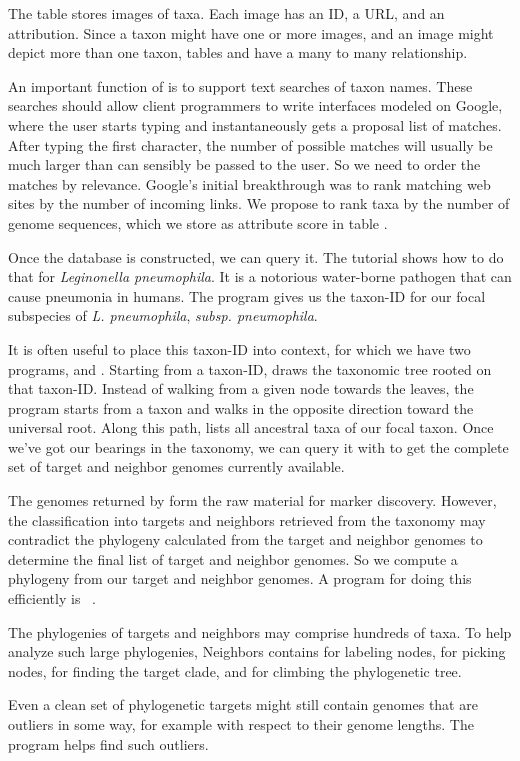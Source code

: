 The table  stores images of taxa. Each image has an ID, a
URL, and an attribution. Since a taxon might have one or more images,
and an image might depict more than one taxon, tables 
and  have a many to many relationship.

An important function of  is to support text searches of
taxon names. These searches should allow client programmers to write
interfaces modeled on Google, where the user starts typing and
instantaneously gets a proposal list of matches. After typing the
first character, the number of possible matches will usually be much
larger than can sensibly be passed to the user. So we need to order
the matches by relevance. Google's initial breakthrough was to rank
matching web sites by the number of incoming links. We propose to rank
taxa by the number of genome sequences, which we store as attribute
score in table .

Once the database is constructed, we can query it. The tutorial shows
how to do that for \emph{Leginonella pneumophila}. It is a notorious
water-borne pathogen that can cause pneumonia in humans. The
program  gives us the taxon-ID for our focal subspecies
of \emph{L. pneumophila}, \emph{subsp. pneumophila}.

It is often useful to place this taxon-ID into context, for which we
have two programs,  and . Starting from a
taxon-ID,  draws the taxonomic tree rooted on that
taxon-ID. Instead of walking from a given node towards the leaves, the
program  starts from a taxon and walks in the opposite
direction toward the universal root. Along this path,  lists
all ancestral taxa of our focal taxon. Once we've got our bearings in
the taxonomy, we can query it with  to get the complete
set of target and neighbor genomes currently available.

The genomes returned by  form the raw material for
marker discovery. However, the classification into targets and
neighbors retrieved from the taxonomy may contradict the phylogeny
calculated from the target and neighbor genomes to determine the final
list of target and neighbor genomes. So we compute a phylogeny from
our target and neighbor genomes. A program for doing this efficiently
is ~\cite{klo20:phy}.

The phylogenies of targets and neighbors may comprise hundreds of
taxa. To help analyze such large phylogenies, Neighbors
contains  for labeling nodes,  for picking nodes,
 for finding the target clade, and  for climbing
the phylogenetic tree.

Even a clean set of phylogenetic targets might still contain genomes
that are outliers in some way, for example with respect to their
genome lengths. The program  helps find such
outliers.
